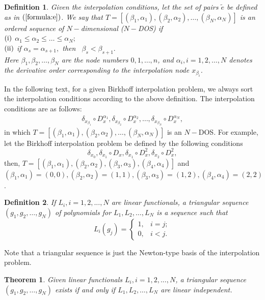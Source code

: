 \documentclass[preprint,12pt]{elsarticle}
\newtheorem{definition}{Definition}%
\newtheorem{theorem}{Theorem}
\begin{document}
\begin{definition}\label{def:order}
Given the interpolation conditions, let the set of pairs $\tilde{e}$ be defined as in  $(\ref{formula:e})$.
We say that $  T = [(\beta_1, \alpha_1), (\beta_2, \alpha_2), \dots, (\beta_N, \alpha_N)] $
is an ordered sequence of $N-$dimensional ($N-$DOS) if\\
\noindent  $\textup{(\romannumeral 1)}$  $ \alpha_1\leq \alpha_2\leq\dots\leq \alpha_N;$\\
\noindent $\textup{(\romannumeral 2)}$ if $\alpha_s=\alpha_{s+1},$ then \ $\beta_{s}< \beta_{s+1}.$\\
Here $\beta_1, \beta_2, \dots, \beta_N $ are the node numbers \( 0, 1, \dots, n \), %
and $\alpha_i,i=1,2,\dots,N$ denotes the derivative order corresponding to the interpolation node $x_{\beta_i}$.
\end{definition}
In the following text, for a given Birkhoff interpolation problem, we always sort the interpolation conditions according to the above definition. The interpolation conditions are as follows:
\begin{align}\label{equa2.1}
   \delta_{x_{\beta_1}}\circ D_x^{\alpha_1},\delta_{x_{\beta_2}}\circ D_x^{\alpha_2},\dots,\delta_{x_{\beta_N}}\circ D_x^{\alpha_N},
\end{align}
in which $  T = [(\beta_1, \alpha_1), (\beta_2, \alpha_2), \dots, (\beta_N, \alpha_N)] $ is an $N-$DOS. For example, let the Birkhoff interpolation problem be defined by the following conditions
\begin{displaymath}
    \delta_{x_0},\delta_{x_1}\circ D_x,\delta_{x_1}\circ D_x^2,\delta_{x_2}\circ D_x^2,
\end{displaymath}
then, $  T = [(\beta_1, \alpha_1), (\beta_2, \alpha_2), (\beta_3, \alpha_3), (\beta_4, \alpha_4)] $ and $(\beta_1, \alpha_1)=(0,0),(\beta_2, \alpha_2)=(1,1), (\beta_3, \alpha_3)=(1,2), (\beta_4, \alpha_4)=(2,2)$.
\begin{definition}\cite{3M}
  If $L_i, i=1,2,...,N$ are linear functionals, a triangular sequence $(g_1,g_2,\dots,g_N)$ of polynomials for $L_1,L_2,\dots,L_N$ is a sequence such that
  $$L_{i}(g_j)=\left\{
    \begin{array}{ll}
      1, & i=j; \\
      0, & i<j.
    \end{array}
  \right.$$
\end{definition}
Note that a triangular sequence is just the Newton-type basis of the interpolation problem.
\begin{theorem}\cite{3M,82lunwen}\label{zhongzhi}
  Given linear functionals $L_i, i=1,2,...,N$, a triangular sequence $(g_1,g_2,\dots,g_N)$ exists if and only if $L_1,L_2,\dots,L_N$ are linear independent.
\end{theorem}
\end{document}
